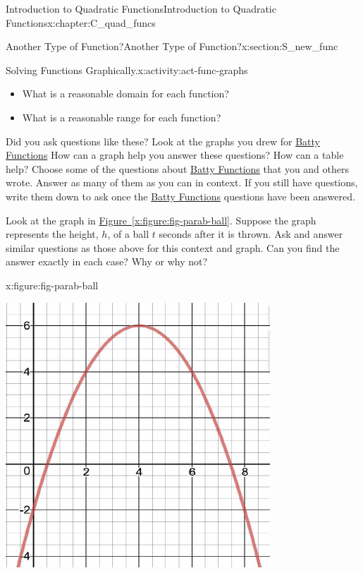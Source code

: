 \documentclass[oneside,10pt,]{book}
\newcommand{\xreffont}{\relax}
\numberwithin{equation}{chapter}
\begin{document}
\begin{chapterptx}{Introduction to Quadratic Functions}{}{Introduction to Quadratic Functions}{}{}{x:chapter:C_quad_funcs}
\begin{sectionptx}{Another Type of Function?}{}{Another Type of Function?}{}{}{x:section:S_new_func}
\begin{activity}{Solving Functions Graphically.}{x:activity:act-func-graphs}
\begin{itemize}[label=\textbullet]
\item{}What is a reasonable domain for each function?%
\item{}What is a reasonable range for each function?%
\end{itemize}
%
\par
Did you ask questions like these? Look at the graphs you drew for \hyperref[x:worksheet:act-batty-func]{Batty Functions} How can a graph help you answer these questions? How can a table help? Choose some of the questions about \hyperref[x:worksheet:act-batty-func]{Batty Functions} that you and others wrote. Answer as many of them as you can in context. If you still have questions, write them down to ask once the \hyperref[x:worksheet:act-batty-func]{Batty Functions} questions have been answered.%
\par
Look at the graph in \hyperref[x:figure:fig-parab-ball]{Figure~{\xreffont\ref{x:figure:fig-parab-ball}}}. Suppose the graph represents the height, \(h\), of a ball \(t\) seconds after it is thrown. Ask and answer similar questions as those above for this context and graph. Can you find the answer exactly in each case? Why or why not?%
\begin{figureptx}{}{x:figure:fig-parab-ball}{}%
\begin{image}{0.25}{0.5}{0.25}%
\includegraphics[width=\linewidth]{external/parab-ball.pdf}

\end{image}
\end{figureptx}
\end{activity}
\end{sectionptx}
\end{chapterptx}
\end{document}
